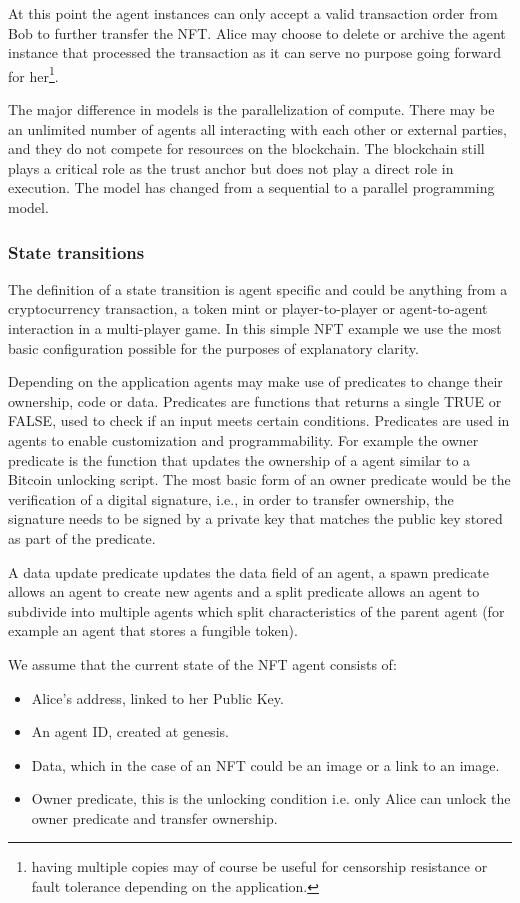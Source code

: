\documentclass{article}
\begin{document}
At this point the agent instances can only accept a valid transaction order from Bob to further transfer the NFT. Alice may choose to delete or archive the agent instance that processed the transaction as it can serve no purpose going forward for her\footnote{having multiple copies may of course be useful for censorship resistance or fault tolerance depending on the application.}.

The major difference in models is the parallelization of compute. There may be an unlimited number of agents all interacting with each other or external parties, and they do not compete for resources on the blockchain. The blockchain still plays a critical role as the trust anchor but does not play a direct role in execution. The model has changed from a sequential to a parallel programming model.

\subsubsection{State transitions}

The definition of a state transition is agent specific and could be anything from a cryptocurrency transaction, a token mint or player-to-player or agent-to-agent interaction in a multi-player game. In this simple NFT example we use the most basic configuration possible for the purposes of explanatory clarity.

Depending on the application agents may make use of predicates to change their ownership, code or data. Predicates are functions that returns a single TRUE or FALSE, used to check if an input meets certain conditions. Predicates are used in agents to enable customization and programmability. For example the owner predicate is the function that updates the ownership of a agent similar to a Bitcoin unlocking script. The most basic form of an owner predicate would be the verification of a digital signature, i.e., in order to transfer ownership, the signature needs to be signed by a private key that matches the public key stored as part of the predicate.

A data update predicate updates the data field of an agent, a spawn predicate allows an agent to create new agents and a split predicate allows an agent to subdivide into multiple agents which split characteristics of the parent agent (for example an agent that stores a fungible token).

We assume that the current state of the NFT agent consists of:

\begin{itemize}
    \item Alice's address, linked to her Public Key.
    \item An agent ID, created at genesis.
    \item Data, which in the case of an NFT could be an image or a link to an image.
    \item Owner  predicate, this is the unlocking condition i.e. only Alice can unlock the owner predicate and transfer ownership.
\end{itemize}
\end{document}
